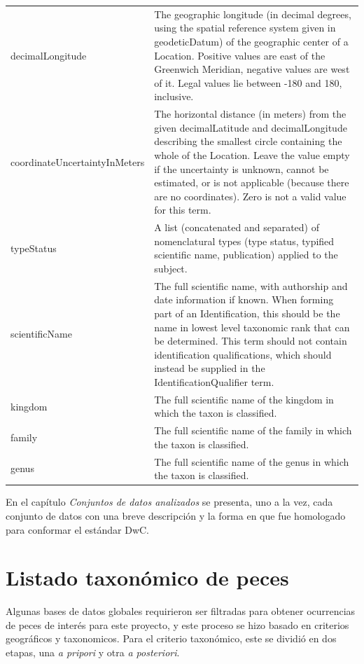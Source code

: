 \documentclass[sn-apa,pdflatex]{sn-jnl}
\begin{document}
\begin{longtable}[t]{>{\raggedright\arraybackslash}p{15em}>{\raggedright\arraybackslash}p{30em}}
decimalLongitude & The geographic longitude (in decimal degrees, using the spatial reference system given in geodeticDatum) of the geographic center of a Location. Positive values are east of the Greenwich Meridian, negative values are west of it. Legal values lie between -180 and 180, inclusive.\\
\addlinespace
coordinateUncertaintyInMeters & The horizontal distance (in meters) from the given decimalLatitude and decimalLongitude describing the smallest circle containing the whole of the Location. Leave the value empty if the uncertainty is unknown, cannot be estimated, or is not applicable (because there are no coordinates). Zero is not a valid value for this term.\\
typeStatus & A list (concatenated and separated) of nomenclatural types (type status, typified scientific name, publication) applied to the subject.\\
scientificName & The full scientific name, with authorship and date information if known. When forming part of an Identification, this should be the name in lowest level taxonomic rank that can be determined. This term should not contain identification qualifications, which should instead be supplied in the IdentificationQualifier term.\\
kingdom & The full scientific name of the kingdom in which the taxon is classified.\\
family & The full scientific name of the family in which the taxon is classified.\\
\addlinespace
genus & The full scientific name of the genus in which the taxon is classified.\\
\bottomrule
\end{longtable}

En el capítulo \emph{Conjuntos de datos analizados} se presenta, uno a
la vez, cada conjunto de datos con una breve descripción y la forma en
que fue homologado para conformar el estándar DwC.

\section{Listado taxonómico de
peces}\label{listado-taxonuxf3mico-de-peces}

Algunas bases de datos globales requirieron ser filtradas para obtener
ocurrencias de peces de interés para este proyecto, y este proceso se
hizo basado en criterios geográficos y taxonomicos. Para el criterio
taxonómico, este se dividió en dos etapas, una \emph{a pripori} y otra
\emph{a posteriori}.
\end{document}
